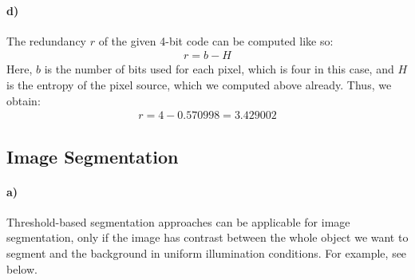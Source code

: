 \documentclass[a4paper,twocolumn]{article}
\begin{document}
	\paragraph{d)} %
	The redundancy $r$ of the given 4-bit code can be computed like so:
	\begin{align*}
	r = b - H
	\end{align*}
	Here, $b$ is the number of bits used for each pixel, which is four in this case, and $H$ is the entropy of the pixel source, which we computed above already. Thus, we obtain:
	\begin{align*}
		r = 4 - 0.570998 = 3.429002
	\end{align*}
	
	\subsection{Image Segmentation}
	
	\paragraph{a)} %
	Threshold-based segmentation approaches can be applicable for image segmentation, only if the image has contrast between the whole object we want to segment and the background in uniform illumination conditions. For example, see  below.
	
\end{document}
